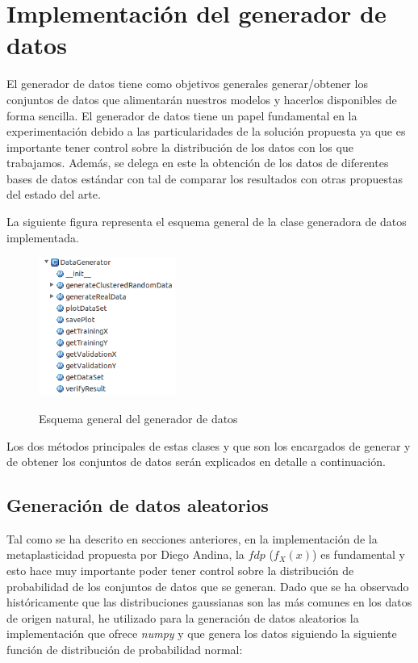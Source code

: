 \documentclass[10pt,a4paper]{report}
\begin{document}
\section{Implementación del generador de datos}
El generador de datos tiene como objetivos generales generar/obtener los conjuntos de datos que alimentarán nuestros modelos y hacerlos disponibles de forma sencilla. El generador de datos tiene un papel fundamental en la experimentación debido a las particularidades de la solución propuesta ya que es importante tener control sobre la distribución de los datos con los que trabajamos. Además, se delega en este la obtención de los datos de diferentes bases de datos estándar con tal de comparar los resultados con otras propuestas del estado del arte.

La siguiente figura representa el esquema general de la clase generadora de datos implementada.
\begin{figure}[!h]{}
    \centering
    \includegraphics[width=0.4\textwidth]{img/GeneradorEsquema.png}
    \label{fig:EsquemaGenerador}
    \caption{Esquema general del generador de datos}
\end{figure}
Los dos métodos principales de estas clases y que son los encargados de generar y de obtener los conjuntos de datos serán explicados en detalle a continuación.

\subsection{Generación de datos aleatorios}
Tal como se ha descrito en secciones anteriores, en la implementación de la metaplasticidad propuesta por Diego Andina\citep{Andina2009}, la $fdp$ ($f_X(x)$) es fundamental y esto hace muy importante poder tener control sobre la distribución de probabilidad de los conjuntos de datos que se generan. Dado que se ha observado históricamente que las distribuciones gaussianas son las más comunes en los datos de origen natural, he utilizado para la generación de datos aleatorios la implementación que ofrece \textit{numpy} y que genera los datos siguiendo la siguiente función de distribución de probabilidad normal: 
\end{document}
